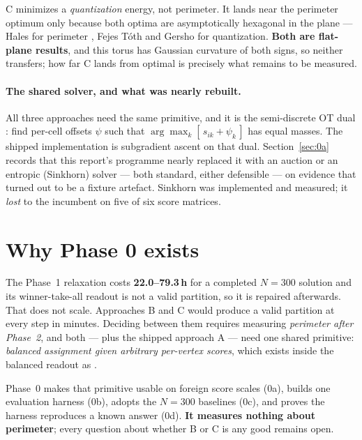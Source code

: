 \documentclass[11pt,a4paper]{article}
\begin{document}
C minimizes a \emph{quantization} energy, not perimeter. It lands near the
perimeter optimum only because both optima are asymptotically hexagonal in the
plane --- Hales for perimeter \cite{hales2001honeycomb}, Fejes T\'oth and Gersho
\cite{gersho1979asymptotically} for quantization. \textbf{Both are flat-plane
results}, and this torus has Gaussian curvature of both signs, so neither
transfers; how far C lands from optimal is precisely what remains to be measured.

\paragraph{The shared solver, and what was nearly rebuilt.} All three approaches
need the same primitive, and it is the semi-discrete OT dual
\cite{aurenhammer1998minkowski, merigot2011multiscale}: find per-cell offsets
\(\psi\) such that \(\arg\max_k[\,s_{ik} + \psi_k\,]\) has equal masses. The
shipped implementation is subgradient ascent on that dual. Section~\ref{sec:0a}
records that this report's programme nearly replaced it with an auction
\cite{bertsekas1988auction} or an entropic (Sinkhorn) solver
\cite{cuturi2013sinkhorn} --- both standard, either defensible --- on evidence
that turned out to be a fixture artefact. Sinkhorn was implemented and measured;
it \emph{lost} to the incumbent on five of six score matrices.

\section{Why Phase 0 exists}

The Phase~1 relaxation costs \textbf{22.0--79.3\,h} for a completed \(N{=}300\)
solution and its winner-take-all readout is not a valid partition, so it is
repaired afterwards. That does not scale. Approaches B and C would produce a
valid partition at every step in minutes. Deciding between them requires
measuring \emph{perimeter after Phase~2}, and both --- plus the shipped approach
A --- need one shared primitive: \emph{balanced assignment given arbitrary
per-vertex scores}, which exists inside the balanced readout as
.

Phase~0 makes that primitive usable on foreign score scales (0a), builds one
evaluation harness (0b), adopts the \(N{=}300\) baselines (0c), and proves the
harness reproduces a known answer (0d). \textbf{It measures nothing about
perimeter}; every question about whether B or C is any good remains open.
\end{document}
